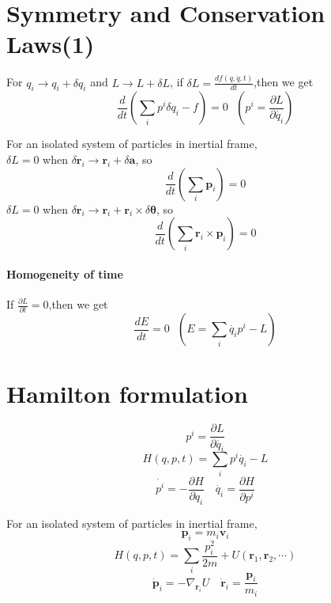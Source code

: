 \documentclass[cyan]{elegantnote}
\begin{document}
\section{Symmetry and Conservation Laws(1)}
\begin{newthem}
For $q_i \to q_i+\delta q_i$ and $L \to L+\delta L$, if $\delta L= \frac{d f(q,\dot{q},t)}{dt}$,then we get
\[\frac{d}{dt}(\sum_i p^i \delta q_i-f)=0 \ \ \ (p^i=\frac{\partial L}{\partial \dot{q_i}})\]
\end{newthem}
\begin{example}
For an isolated system of particles in inertial frame,\\ 
$\delta L = 0$ when $\delta \bm{r}_i \rightarrow \bm{r}_i + \delta \bm{a}$, so
\[\frac{d}{dt} (\sum_i \bm{p}_i) = 0\]
$\delta L = 0$ when $\delta \bm{r}_i \rightarrow \bm{r}_i + \bm{r}_i \times \delta \bm{\theta}$, so
\[\frac{d}{dt} (\sum_i \bm{r}_i \times \bm{p}_i) = 0\]
\end{example}

\paragraph{Homogeneity of time}
If $\frac{\partial L}{\partial t}=0$,then we get
\[\frac{dE}{dt}=0 \ \ \ (E=\sum_i \dot{q_i}p^i-L)\]

\section{Hamilton formulation}
\[p^i = \frac{\partial L}{\partial \dot{q_i}}\]
\[H(q,p,t)=\sum_i p^i \dot{q_i}-L\]
\[\dot{p^i}=-\frac{\partial H}{\partial q_i} \quad \dot{q_i}=\frac{\partial H}{\partial p^i}\]
\begin{example}
 For an isolated system of particles in inertial frame, 
\[\bm{p}_i = m_i \bm{v}_i\]
\[H(q,p,t)=\sum_i \frac{p_i^2}{2m} + U(\bm{r}_1,\bm{r}_2,\cdots)\]
\[\dot{\bm{p}}_i =-\nabla_{\bm{r}_i} U \quad \dot{\bm{r}}_i = \frac{\bm{p}_i}{m_i}\]
\end{example}
 
\end{document}
